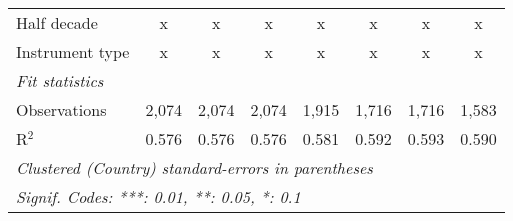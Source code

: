 \begin{tabular}{lccccccc}
   Half decade                                                                            & x            & x            & x            & x            & x            & x            & x\\  
   Instrument type                                                                        & x            & x            & x            & x            & x            & x            & x\\  
   \midrule \emph{Fit statistics}\\
   Observations                                                                           & 2,074        & 2,074        & 2,074        & 1,915        & 1,716        & 1,716        & 1,583\\  
   R$^2$                                                                                  & 0.576        & 0.576        & 0.576        & 0.581        & 0.592        & 0.593        & 0.590\\  
   \midrule
   \multicolumn{8}{l}{\emph{Clustered (Country) standard-errors in parentheses}}\\
   \multicolumn{8}{l}{\emph{Signif. Codes: ***: 0.01, **: 0.05, *: 0.1}}\\
\end{tabular}
\par\endgroup


